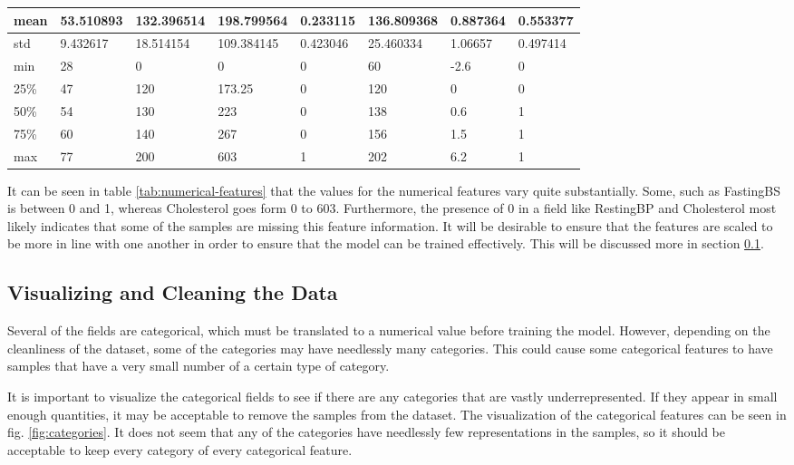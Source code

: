 \documentclass[12pt,conference]{IEEEtran}
\begin{document}
\begin{table}[t]
\begin{tabular}{|l|l|l|l|l|l|l|l|}
        mean & 53.510893 & 132.396514 & 198.799564 & 0.233115 & 136.809368 & 0.887364 & 0.553377 \\ \hline
        std & 9.432617 & 18.514154 & 109.384145 & 0.423046 & 25.460334 & 1.06657 & 0.497414 \\ \hline
        min & 28 & 0 & 0 & 0 & 60 & -2.6 & 0 \\ \hline
        25\% & 47 & 120 & 173.25 & 0 & 120 & 0 & 0 \\ \hline
        50\% & 54 & 130 & 223 & 0 & 138 & 0.6 & 1 \\ \hline
        75\% & 60 & 140 & 267 & 0 & 156 & 1.5 & 1 \\ \hline
        max & 77 & 200 & 603 & 1 & 202 & 6.2 & 1 \\ \hline
    \end{tabular}
\end{table}

It can be seen in table \ref{tab:numerical-features} that the values for the numerical features vary quite substantially. Some, such as FastingBS is between 0 and 1, whereas Cholesterol goes form 0 to 603. Furthermore, the presence of 0 in a field like RestingBP and Cholesterol most likely indicates that some of the samples are missing this feature information. It will be desirable to ensure that the features are scaled to be more in line with one another in order to ensure that the model can be trained effectively. This will be discussed more in section \ref{CleaningData}.

\subsection{Visualizing and Cleaning the Data}
\label{CleaningData}
Several of the fields are categorical, which must be translated to a numerical value before training the model. However, depending on the cleanliness of the dataset, some of the categories may have needlessly many categories. This could cause some categorical features to have samples that have a very small number of a certain type of category.

It is important to visualize the categorical fields to see if there are any categories that are vastly underrepresented. If they appear in small enough quantities, it may be acceptable to remove the samples from the dataset. The visualization of the categorical features can be seen in fig. \ref{fig:categories}. It does not seem that any of the categories have needlessly few representations in the samples, so it should be acceptable to keep every category of every categorical feature.
\end{document}
